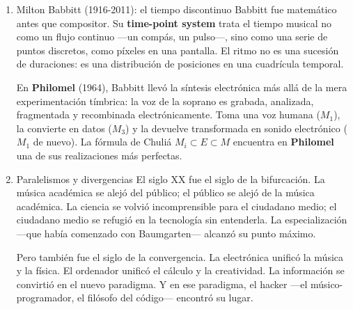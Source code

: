 \documentclass[14pt, a4paper]{article}
\begin{document}
\begin{enumerate}
\begin{verbatim}
(
// Rutina estocástica: nube de sonidos controlada estadísticamente
~nube_estocastica = Routine({
    var densidad = 20;        // Eventos por segundo (textura)
    var centro_freq = 440;    // Frecuencia central (La4)
    var dispersion = 200;     // Dispersión alrededor del centro
    var duracion_base = 0.15; // Duración base de cada grano

    loop {
        // Frecuencia: distribución gaussiana alrededor del centro
        var freq = centro_freq + (dispersion * rrand(-1.0, 1.0)).gauss(0.5);
        // Amplitud: valores bajos para nubes suaves
        var amp = exprand(0.02, 0.08);
        // Panorámica: distribución espacial aleatoria
        var pan = rrand(-0.8, 0.8);
        // Duración variable de cada grano
        var dur = duracion_base * rrand(0.5, 2.0);

        Synth(\grano_xenakis, [
            \freq, freq.max(50).min(2000),
            \amp, amp,
            \pan, pan,
            \duracion, dur
        ]);

        (1.0 / densidad).wait;  // Control de densidad
    };
});

// Iniciar la nube estocástica
~nube_estocastica.play;
)

// Para detener: Cmd + . (o Ctrl + .)
\end{verbatim}
\item Milton Babbitt (1916-2011): el tiempo discontinuo
\label{babbitt-siglo-xx}
Babbitt fue matemático antes que compositor. Su \textbf{time-point system}
trata el tiempo musical no como un flujo continuo —un compás, un
pulso—, sino como una serie de puntos discretos, como píxeles en una
pantalla. El ritmo no es una sucesión de duraciones: es una
distribución de posiciones en una cuadrícula temporal.

En \textbf{Philomel} (1964), Babbitt llevó la síntesis electrónica más allá
de la mera experimentación tímbrica: la voz de la soprano es grabada,
analizada, fragmentada y recombinada electrónicamente. Toma una voz
humana (\(M_1\)), la convierte en datos (\(M_3\)) y la devuelve
transformada en sonido electrónico (\(M_1\) de nuevo). La fórmula de
Chuliá \(M_i \subset E \subset M\) encuentra en \textbf{Philomel} una de sus
realizaciones más perfectas.
\item Paralelismos y divergencias
\label{paralelismos-siglo-xx}
El siglo XX fue el siglo de la bifurcación. La música académica se
alejó del público; el público se alejó de la música académica. La
ciencia se volvió incomprensible para el ciudadano medio; el ciudadano
medio se refugió en la tecnología sin entenderla. La especialización
—que había comenzado con Baumgarten— alcanzó su punto máximo.

Pero también fue el siglo de la convergencia. La electrónica unificó
la música y la física. El ordenador unificó el cálculo y la
creatividad. La información se convirtió en el nuevo paradigma. Y en
ese paradigma, el hacker —el músico-programador, el filósofo del
código— encontró su lugar.
\end{enumerate}
\end{document}
